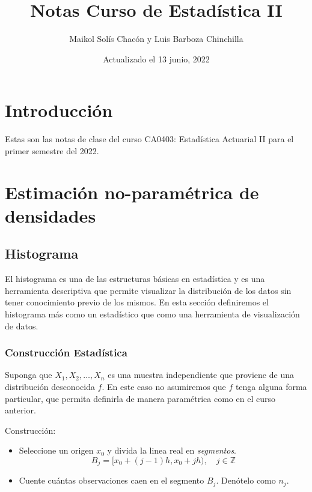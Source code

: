 \documentclass[
  12pt,
]{book}
\title{Notas Curso de Estadística II}
\author{Maikol Solís Chacón y Luis Barboza Chinchilla}
\date{Actualizado el 13 junio, 2022}
\theoremstyle{definition}
\theoremstyle{definition}
\theoremstyle{definition}
\theoremstyle{definition}
\theoremstyle{remark}
\begin{document}
\maketitle

{
\hypersetup{linkcolor=}
\setcounter{tocdepth}{4}
\tableofcontents
}
\hypertarget{introducciuxf3n}{%
\chapter{Introducción}\label{introducciuxf3n}}

Estas son las notas de clase del curso CA0403: Estadística Actuarial II para el primer semestre del 2022.

\hypertarget{estimaciuxf3n-no-paramuxe9trica-de-densidades}{%
\chapter{Estimación no-paramétrica de densidades}\label{estimaciuxf3n-no-paramuxe9trica-de-densidades}}

\hypertarget{histograma}{%
\section{Histograma}\label{histograma}}

El histograma es una de las estructuras básicas en estadística y es una herramienta descriptiva que permite visualizar la distribución de los datos sin tener conocimiento previo de los mismos. En esta sección definiremos el histograma más como un estadístico que como una herramienta de visualización de datos.

\hypertarget{construcciuxf3n-estaduxedstica}{%
\subsection{Construcción Estadística}\label{construcciuxf3n-estaduxedstica}}

Suponga que \(X_1,X_2, \dots ,X_n\) es una muestra independiente que proviene de una distribución desconocida \(f\). En este caso no asumiremos que \(f\) tenga alguna forma particular, que permita definirla de manera paramétrica como en el curso anterior.

Construcción:

\begin{itemize}
\item
  Seleccione un origen \(x_0\) y divida la linea real en \emph{segmentos}.
  \begin{equation*}
  B_j = [x_0 +(j - 1)h,x_0 + jh), \quad j\in \mathbb{Z}
  \end{equation*}
\item
  Cuente cuántas observaciones caen en el segmento \(B_j\). Denótelo como \(n_j\).
\end{itemize}
\end{document}
